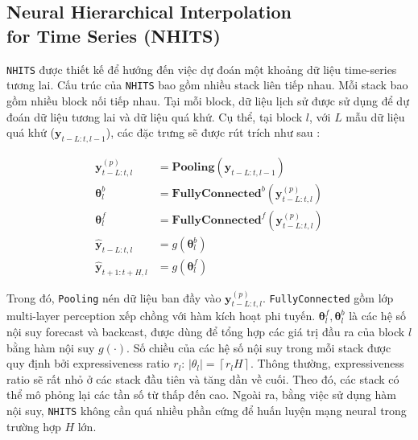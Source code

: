 \documentclass[aps,prb,groupedaddress,twocolumn,showpacs,dvipdfmx,superscriptaddress,pdftex]{revtex4-2}
\begin{document}
\subsection{Neural Hierarchical Interpolation\\for Time Series (NHITS)}

\verb|NHITS| được thiết kế để hướng đến việc dự đoán một khoảng dữ liệu time-series tương lai. Cấu trúc của \verb|NHITS| bao gồm nhiều stack liên tiếp nhau. Mỗi stack bao gồm nhiều block nối tiếp nhau. Tại mỗi block, dữ liệu lịch sử được sử dụng để dự đoán dữ liệu tương lai và dữ liệu quá khứ. Cụ thể, tại block $l$, với $L$ mẫu dữ liệu quá khứ ($\mathbf{y}_{t-L:t, l-1}$), các đặc trưng sẽ được rút trích như sau \cite{challu2023nhits}:


\begin{align}
    \mathbf{y}_{t-L:t, l}^{(p)} &= \mathbf{Pooling}\left( \mathbf{y}_{t-L:t, l-1} \right)\\
    \mathbf{\theta}_l^b &= \mathbf{FullyConnected}^b \left( \mathbf{y}_{t-L:t, l}^{(p)} \right)\\
    \mathbf{\theta}_l^f &= \mathbf{FullyConnected}^f \left( \mathbf{y}_{t-L:t, l}^{(p)} \right)\\
    \mathbf{\hat{y}}_{t-L:t, l} &= g\left(\mathbf{\theta}_l^b\right)\\
    \mathbf{\hat{y}}_{t+1:t+H, l} &= g\left(\mathbf{\theta}_l^f\right)
\end{align}

Trong đó, \verb|Pooling| nén dữ liệu ban đầy vào $\mathbf{y}_{t-L:t, l}^{(p)}$. \verb|FullyConnected| gồm lớp multi-layer perception xếp chồng với hàm kích hoạt phi tuyến. $\mathbf{\theta}_l^f, \mathbf{\theta}_l^b$ là các hệ số nội suy forecast và backcast, được dùng để tổng hợp các giá trị đầu ra của block $l$ bằng hàm nội suy $g(\cdot)$. Số chiều của các hệ số nội suy trong mỗi stack được quy định bởi expressiveness ratio $r_l$: $\left| \theta_l \right| =  \left \lceil r_l H \right \rceil$. Thông thường, expressiveness ratio sẽ rất nhỏ ở các stack đầu tiên và tăng dần về cuối. Theo đó, các stack có thể mô phỏng lại các tần số từ thấp đến cao. Ngoài ra, bằng việc sử dụng hàm nội suy, \verb|NHITS| không cần quá nhiều phần cứng để huấn luyện mạng neural trong trường hợp $H$ lớn.
\end{document}
